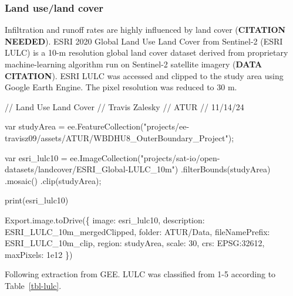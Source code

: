 \documentclass[
]{agujournal2019}
\newenvironment{Shaded}{\begin{snugshade}}{\end{snugshade}}
\newcommand{\NormalTok}[1]{\textcolor[rgb]{0.00,0.23,0.31}{#1}}
\begin{document}
\subsubsection{Land use/land cover}\label{land-useland-cover}

Infiltration and runoff rates are highly influenced by land cover
(\textbf{CITATION NEEDED}). ESRI 2020 Global Land Use Land Cover from
Sentinel-2 (ESRI LULC) is a 10-m resolution global land cover dataset
derived from proprietary machine-learning algorithm run on Sentinel-2
satellite imagery (\textbf{DATA CITATION}). ESRI LULC was accessed and
clipped to the study area using Google Earth Engine. The pixel
resolution was reduced to 30 m.

\begin{Shaded}
\begin{Highlighting}[]
\NormalTok{// Land Use Land Cover}
\NormalTok{// Travis Zalesky}
\NormalTok{// ATUR}
\NormalTok{// 11/14/24}

\NormalTok{var studyArea = ee.FeatureCollection("projects/ee{-}travisz09/assets/ATUR/WBDHU8\_OuterBoundary\_Project");}

\NormalTok{var esri\_lulc10 = ee.ImageCollection("projects/sat{-}io/open{-}datasets/landcover/ESRI\_Global{-}LULC\_10m")}
\NormalTok{  .filterBounds(studyArea)}
\NormalTok{  .mosaic()}
\NormalTok{  .clip(studyArea);}
  
\NormalTok{print(esri\_lulc10)}

\NormalTok{Export.image.toDrive(\{}
\NormalTok{  image: esri\_lulc10, }
\NormalTok{  description: \textquotesingle{}ESRI\_LULC\_10m\_mergedClipped\textquotesingle{},}
\NormalTok{  folder: \textquotesingle{}ATUR/Data\textquotesingle{},}
\NormalTok{  fileNamePrefix: \textquotesingle{}ESRI\_LULC\_10m\_clip\textquotesingle{},}
\NormalTok{  region: studyArea,}
\NormalTok{  scale: 30,}
\NormalTok{  crs: \textquotesingle{}EPSG:32612\textquotesingle{},}
\NormalTok{  maxPixels: 1e12}
\NormalTok{\})}
\end{Highlighting}
\end{Shaded}

Following extraction from GEE. LULC was classified from 1-5 according to
Table~\ref{tbl-lulc}.
\end{document}
